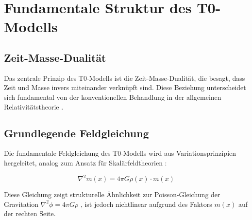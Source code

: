 	\section{Fundamentale Struktur des T0-Modells}
	\label{sec:fundamental_structure}
	
	\subsection{Zeit-Masse-Dualität}
	\label{subsec:time_mass_duality}
	
	Das zentrale Prinzip des T0-Modells ist die Zeit-Masse-Dualität, die besagt, dass Zeit und Masse invers miteinander verknüpft sind. Diese Beziehung unterscheidet sich fundamental von der konventionellen Behandlung in der allgemeinen Relativitätstheorie \citep{einstein1915,misner1973}.
	
	\begin{table}[htbp]
		\centering
		\caption{Vergleich der Zeit-Masse-Behandlung verschiedener Theorien}
		\label{tab:theory_comparison}
	\end{table}
	
	\subsection{Grundlegende Feldgleichung}
	\label{subsec:field_equation}
	
	Die fundamentale Feldgleichung des T0-Modells wird aus Variationsprinzipien hergeleitet, analog zum Ansatz für Skalärfeldtheorien \citep{weinberg1995}:
	
	\begin{equation}
		\label{eq:field_equation_fundamental}
		\nabla^2 m(x) = 4\pi G \rho(x) \cdot m(x)
	\end{equation}
	
	Diese Gleichung zeigt strukturelle Ähnlichkeit zur Poisson-Gleichung der Gravitation $\nabla^2 \phi = 4\pi G \rho$ \citep{jackson1998}, ist jedoch nichtlinear aufgrund des Faktors $m(x)$ auf der rechten Seite.
	
